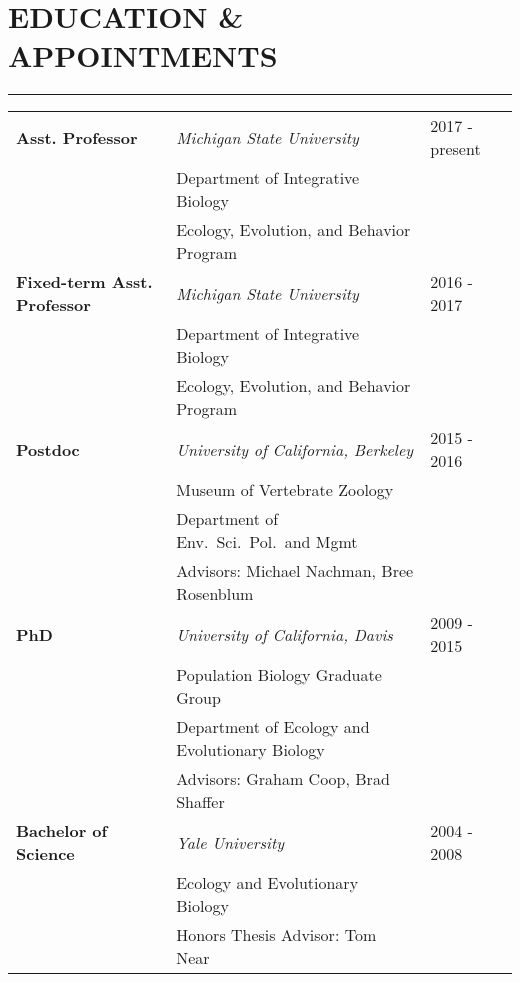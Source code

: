 \documentclass{article}
\begin{document}
\section*{EDUCATION \& APPOINTMENTS}
\vspace{-0.6cm}
\rule{470pt}{0.4pt}
%
\begin{tabular}{p{} p{} p{}} 
\\
\bf{Asst. Professor} & \it{Michigan State University} & \hfill 2017 - present\\
 & \hspace{0.5cm}Department of Integrative Biology & \\
 & \hspace{0.5cm}Ecology, Evolution, and Behavior Program& \\
%
%
\bf{Fixed-term Asst. Professor} & \it{Michigan State University} & \hfill 2016 - 2017\\
 & \hspace{0.5cm}Department of Integrative Biology & \\
 & \hspace{0.5cm}Ecology, Evolution, and Behavior Program& \\
%
%
\bf{Postdoc} & \it{University of California, Berkeley} & \hfill 2015 - 2016\\
 & \hspace{0.5cm}Museum of Vertebrate Zoology & \\
 & \hspace{0.5cm}Department of Env.\ Sci.\ Pol.\ and Mgmt& \\
 & \hspace{0.5cm}Advisors: Michael Nachman, Bree Rosenblum & \\ 
%
%
\bf{PhD} & \it{University of California, Davis}  & \hfill 2009 - 2015\\
 & \hspace{0.5cm}Population Biology Graduate Group & \\
 & \hspace{0.5cm}Department of Ecology and Evolutionary Biology & \\
 & \hspace{0.5cm}Advisors: Graham Coop, Brad Shaffer & \\ 
%
%
\textbf{Bachelor of Science} & \it{Yale University} & \hfill 2004 - 2008 \\
& \hspace{0.5cm}Ecology and Evolutionary Biology & \\
& \hspace{0.5cm}Honors Thesis Advisor: Tom Near & \\
\end{tabular}
\end{document}
